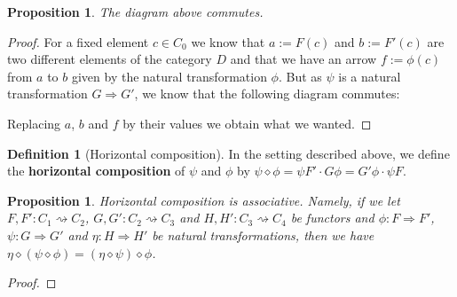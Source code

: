 \documentclass{scrartcl}
\newtheorem{prop}[thm]{Proposition}
\theoremstyle{definition}
\newtheorem{defn}[thm]{Definition}
\theoremstyle{remark}
\begin{document}
\begin{prop}
    The diagram above commutes.
\end{prop}
\begin{proof}
For a fixed element $c \in C_0$ we know that $a := F(c)$ and $b := F'(c)$ are two different elements of the category $D$ and that we have an arrow $f := \phi(c)$ from $a$ to $b$ given by the natural transformation $\phi$.
But as $\psi$ is a natural transformation $G \Rightarrow G'$, we know that the following diagram commutes:
\begin{figure}[h]
    \centering
{}
\end{figure}

Replacing $a$, $b$ and $f$ by their values we obtain what we wanted.
\end{proof}


\begin{defn}[Horizontal composition]\label{horizcomp}
    In the setting described above, we define the \textbf{horizontal composition} of $\psi$ and $\phi$ by $\psi \diamond \phi = \psi F' \cdot G\phi = G'\phi\cdot \psi F$.
\end{defn}
\begin{prop}
    Horizontal composition is associative. Namely, if we let $F,F':C_1 \rightsquigarrow C_2$, $G,G':C_2\rightsquigarrow C_3$ and $H,H':C_3\rightsquigarrow C_4$ be functors and $\phi: F\Rightarrow F'$, $\psi:G\Rightarrow G'$ and $\eta: H\Rightarrow H'$ be natural transformations, then we have $\eta \diamond (\psi \diamond \phi)= (\eta \diamond \psi)\diamond \phi$.
\end{prop}
\begin{proof}

\end{proof}
\end{document}
